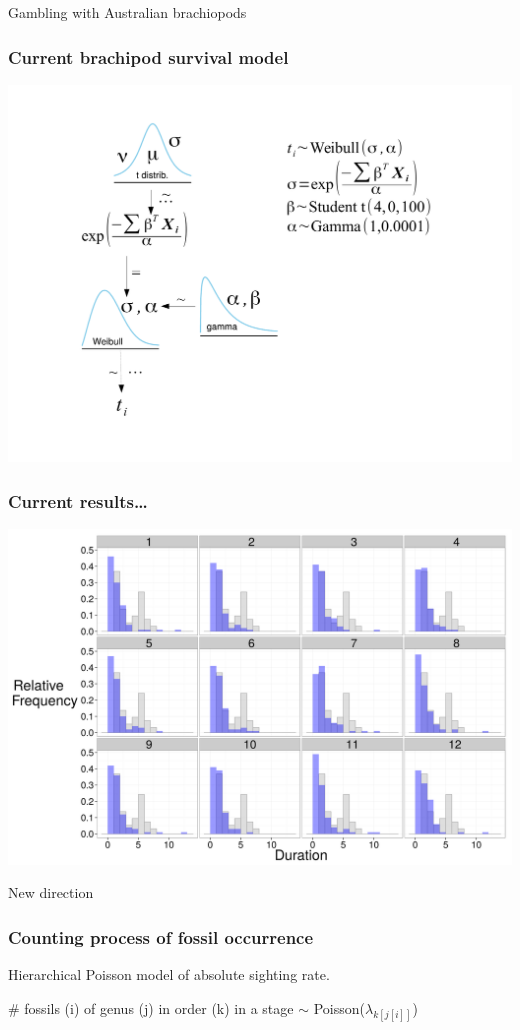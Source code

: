 \documentclass{beamer}
\begin{document}


\begin{frame}
  Gambling with Australian brachiopods
\end{frame}

\begin{frame}
  \frametitle{Current brachipod survival model}
  \begin{center}
    \includegraphics[height = 0.8\textheight, width = \textwidth,  keepaspectratio = true]{figure/brac_surv_mod}
  \end{center}
\end{frame}

\begin{frame}
  \frametitle{Current results\dots}
  \begin{center}
    \includegraphics[height = 0.8\textheight, width = \textwidth,  keepaspectratio = true]{figure/brac_dur_post}
  \end{center}
\end{frame}

\begin{frame}
  New direction
\end{frame}

\begin{frame}
  \frametitle{Counting process of fossil occurrence}
  
  Hierarchical Poisson model of absolute sighting rate.

  \# fossils (i) of genus (j) in order (k) in a stage \(\sim\) Poisson(\(\lambda_{k\left[j\left[i\right]\right]}\))

\end{frame}
\end{document}
